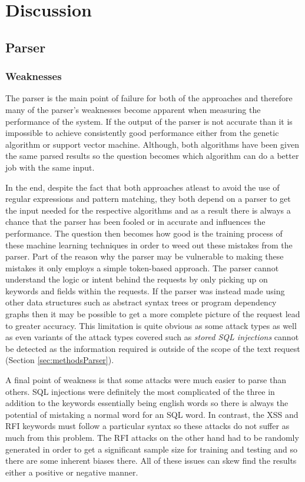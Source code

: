 \chapter{Discussion}

\section{Parser}
\subsection{Weaknesses}\label{sec:parseWeak}

The parser is the main point of failure for both of the approaches and therefore many of the parser's weaknesses become apparent when measuring the performance of the system.  If the output of the parser is not accurate than it is impossible to achieve consistently good performance either from the genetic algorithm or support vector machine. Although, both algorithms have been given the same parsed results so the question becomes which algorithm can do a better job with the same input.  

In the end, despite the fact that both approaches atleast to avoid the use of regular expressions and pattern matching, they both depend on a parser to get the input needed for the respective algorithms and as a result there is always a chance that the parser has been fooled or in accurate and influences the performance.  The question then becomes how good is the training process of these machine learning techniques in order to weed out these mistakes from the parser.  Part of the reason why the parser may be vulnerable to making these mistakes it only employs a simple token-based approach.  The parser cannot understand the logic or intent behind the requests by only picking up on keywords and fields within the requests.  If the parser was instead made using other data structures such as abstract syntax trees or program dependency graphs then it may be possible to get a more complete picture of the request lead to greater accuracy.  This limitation is quite obvious as some attack types as well as even variants of the attack types covered such as \textit{stored SQL injections} cannot be detected as the information required is outside of the scope of the text request (Section \ref{sec:methodsParser}). 

A final point of weakness is that some attacks were much easier to parse than others.  SQL injections were definitely the most complicated of the three in addition to the keywords essentially being english words so there is always the potential of mistaking a normal word for an SQL word.  In contrast, the XSS and RFI keywords must follow a particular syntax so these attacks do not suffer as much from this problem.  The RFI attacks on the other hand had to be randomly generated in order to get a significant sample size for training and testing and so there are some inherent biases there.  All of these issues can skew find the results either a positive or negative manner.

